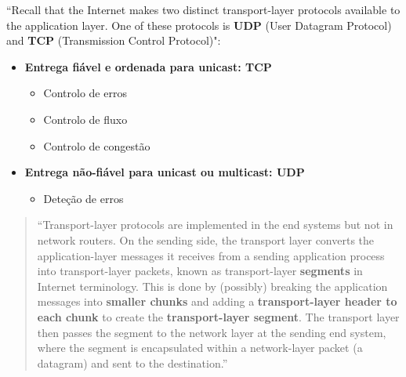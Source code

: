 \vspace{0.5 em}
\noindent ``Recall that the Internet makes two distinct transport-layer protocols available to the application layer. One of these protocols is \textbf{UDP} (User Datagram Protocol) and \textbf{TCP} (Transmission Control Protocol)":

\begin{itemize}
    \item \textbf{Entrega fiável e ordenada para unicast: TCP}
    \vspace{-0.25em}    
    \begin{itemize}
        \item Controlo de erros
        \item Controlo de fluxo
        \item Controlo de congestão
    \end{itemize}
    
    \item \textbf{Entrega não-fiável para unicast ou multicast: UDP}
    \vspace{-0.25em}
    \begin{itemize}
        \item Deteção de erros
    \end{itemize}
\end{itemize}

\clearpage
\begin{quote}
    ``Transport-layer protocols are implemented in the end systems but not in network routers. On the sending side, the transport layer converts the application-layer messages it receives from a sending application process into transport-layer packets, known as transport-layer \textbf{segments} in Internet terminology. This is done by (possibly) breaking the application messages into \textbf{smaller chunks} and adding a \textbf{transport-layer header to each chunk} to create the \textbf{transport-layer segment}. The transport layer then passes the segment to the network layer at the sending end system, where the segment is encapsulated within a network-layer packet (a datagram) and sent to the destination.''\cite{Kurose2017}
\end{quote}


